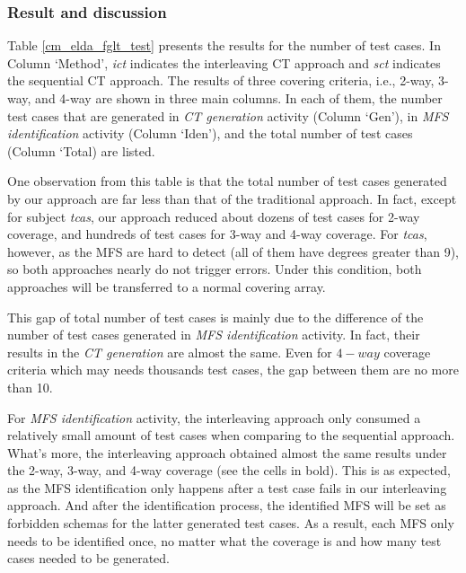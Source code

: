 \documentclass{sig-alternate}
\begin{document}




\subsubsection{Result and discussion}
Table \ref{cm_elda_fglt_test} presents the results for the number of test cases. In Column `Method', \emph{ict} indicates the interleaving CT approach and \emph{sct} indicates the sequential CT approach. The results of three covering criteria, i.e., 2-way, 3-way, and 4-way are shown in three main columns. In each of them, the number test cases that are generated in \emph{CT generation} activity (Column `Gen'), in \emph{MFS identification} activity (Column `Iden'), and the total number of test cases (Column `Total) are listed.

One observation from this table is that the total number of test cases generated by our approach are far less than that of the traditional approach. In fact, except for subject \emph{tcas}, our approach reduced about dozens of test cases for 2-way coverage, and hundreds of test cases for 3-way and 4-way coverage. For \emph{tcas}, however, as the MFS are hard to detect (all of them have degrees greater than 9), so both approaches nearly do not trigger errors. Under this condition, both approaches will be transferred to a normal covering array.

This gap of total number of test cases is mainly due to the difference of the number of test cases generated in \emph{MFS identification} activity. In fact, their results in the \emph{CT generation} are almost the same. Even for $4-way$ coverage criteria which may needs thousands test cases, the gap between them are no more than 10.

For \emph{MFS identification} activity, the interleaving approach only consumed a relatively small amount of test cases when comparing to the sequential approach. What's more, the interleaving approach obtained almost the same results under the 2-way, 3-way, and 4-way coverage (see the cells in bold). This is as expected, as the MFS identification only happens after a test case fails in our interleaving approach. And after the identification process, the identified MFS will be set as forbidden schemas for the latter generated test cases. As a result, each MFS only needs to be identified once, no matter what the coverage is and how many test cases needed to be generated.
\end{document}
